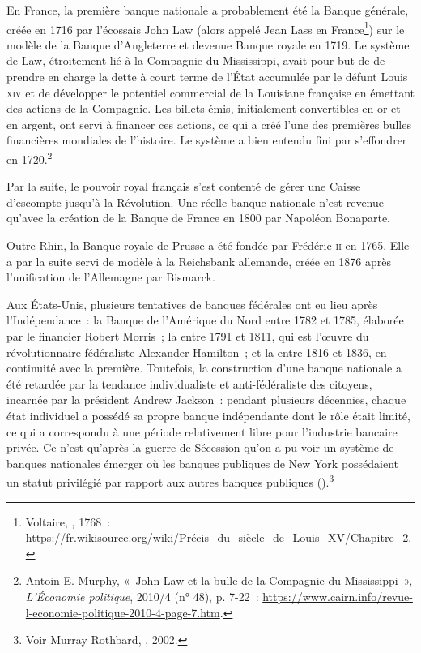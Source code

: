 En France, la première banque nationale a probablement été la Banque générale, créée en 1716 par l'écossais John Law (alors appelé Jean Lass en France\footnote{Voltaire, , 1768~: \url{https://fr.wikisource.org/wiki/Précis_du_siècle_de_Louis_XV/Chapitre_2}.}) sur le modèle de la Banque d'Angleterre et devenue Banque royale en 1719. Le système de Law, étroitement lié à la Compagnie du Mississippi, avait pour but de de prendre en charge la dette à court terme de l'État accumulée par le défunt Louis \textsc{xiv} et de développer le potentiel commercial de la Louisiane française en émettant des actions de la Compagnie. Les billets émis, initialement convertibles en or et en argent, ont servi à financer ces actions, ce qui a créé l'une des premières bulles financières mondiales de l'histoire. Le système a bien entendu fini par s'effondrer en 1720.\footnote{Antoin E. Murphy, «~John Law et la bulle de la Compagnie du Mississippi~», \emph{L'Économie politique}, 2010/4 (n° 48), p. 7-22~: \url{https://www.cairn.info/revue-l-economie-politique-2010-4-page-7.htm}.}

Par la suite, le pouvoir royal français s'est contenté de gérer une Caisse d'escompte jusqu'à la Révolution. Une réelle banque nationale n'est revenue qu'avec la création de la Banque de France en 1800 par Napoléon Bonaparte.

Outre-Rhin, la Banque royale de Prusse a été fondée par Frédéric \textsc{ii} en 1765. Elle a par la suite servi de modèle à la Reichsbank allemande, créée en 1876 après l'unification de l'Allemagne par Bismarck.

Aux États-Unis, plusieurs tentatives de banques fédérales ont eu lieu après l'Indépendance~: la Banque de l'Amérique du Nord entre 1782 et 1785, élaborée par le financier Robert Morris~; la  entre 1791 et 1811, qui est l'œuvre du révolutionnaire fédéraliste Alexander Hamilton~; et la  entre 1816 et 1836, en continuité avec la première. Toutefois, la construction d'une banque nationale a été retardée par la tendance individualiste et anti-fédéraliste des citoyens, incarnée par la président Andrew Jackson~: pendant plusieurs décennies, chaque état individuel a possédé sa propre banque indépendante dont le rôle était limité, ce qui a correspondu à une période relativement libre pour l'industrie bancaire privée. Ce n'est qu'après la guerre de Sécession qu'on a pu voir un système de banques nationales émerger où les banques publiques de New York possédaient un statut privilégié par rapport aux autres banques publiques ().\footnote{Voir Murray Rothbard, , 2002.} %

